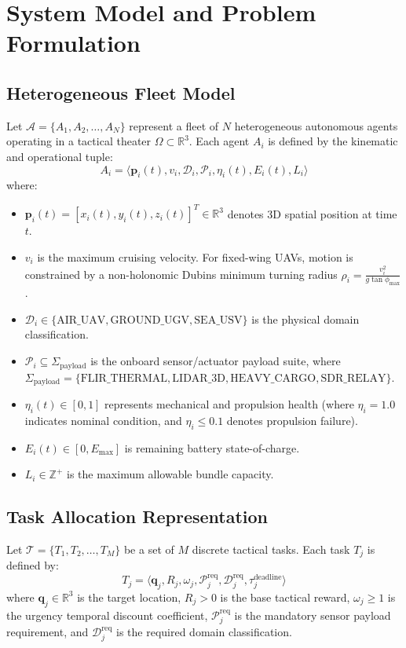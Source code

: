 \documentclass[journal,10pt,twocolumn]{IEEEtran}
\begin{document}
\section{System Model and Problem Formulation}

\subsection{Heterogeneous Fleet Model}
Let $\mathcal{A} = \{A_1, A_2, \dots, A_N\}$ represent a fleet of $N$ heterogeneous autonomous agents operating in a tactical theater $\Omega \subset \mathbb{R}^3$. Each agent $A_i$ is defined by the kinematic and operational tuple:
\begin{equation}
A_i = \langle \mathbf{p}_i(t), v_i, \mathcal{D}_i, \mathcal{P}_i, \eta_i(t), E_i(t), L_i \rangle
\end{equation}
where:
\begin{itemize}
    \item $\mathbf{p}_i(t) = [x_i(t), y_i(t), z_i(t)]^T \in \mathbb{R}^3$ denotes 3D spatial position at time $t$.
    \item $v_i$ is the maximum cruising velocity. For fixed-wing UAVs, motion is constrained by a non-holonomic Dubins minimum turning radius $\rho_i = \frac{v_i^2}{g \tan \phi_{\max}}$.
    \item $\mathcal{D}_i \in \{\text{AIR\_UAV}, \text{GROUND\_UGV}, \text{SEA\_USV}\}$ is the physical domain classification.
    \item $\mathcal{P}_i \subseteq \Sigma_{\text{payload}}$ is the onboard sensor/actuator payload suite, where $\Sigma_{\text{payload}} = \{\text{FLIR\_THERMAL}, \text{LIDAR\_3D}, \text{HEAVY\_CARGO}, \text{SDR\_RELAY}\}$.
    \item $\eta_i(t) \in [0, 1]$ represents mechanical and propulsion health (where $\eta_i = 1.0$ indicates nominal condition, and $\eta_i \le 0.1$ denotes propulsion failure).
    \item $E_i(t) \in [0, E_{\max}]$ is remaining battery state-of-charge.
    \item $L_i \in \mathbb{Z}^+$ is the maximum allowable bundle capacity.
\end{itemize}

\subsection{Task Allocation Representation}
Let $\mathcal{T} = \{T_1, T_2, \dots, T_M\}$ be a set of $M$ discrete tactical tasks. Each task $T_j$ is defined by:
\begin{equation}
T_j = \langle \mathbf{q}_j, R_j, \omega_j, \mathcal{P}_j^{\text{req}}, \mathcal{D}_j^{\text{req}}, \tau_j^{\text{deadline}} \rangle
\end{equation}
where $\mathbf{q}_j \in \mathbb{R}^3$ is the target location, $R_j > 0$ is the base tactical reward, $\omega_j \ge 1$ is the urgency temporal discount coefficient, $\mathcal{P}_j^{\text{req}}$ is the mandatory sensor payload requirement, and $\mathcal{D}_j^{\text{req}}$ is the required domain classification.
\end{document}
